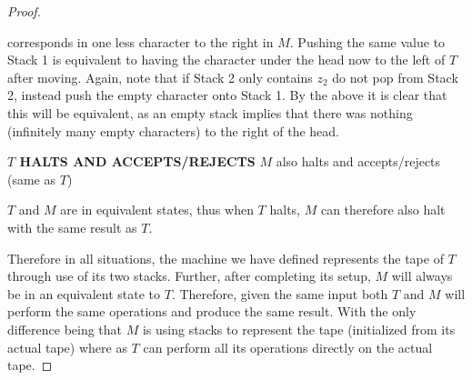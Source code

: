 \documentclass[12pt]{jhwhw}
\begin{document}
\begin{proof}
\begin{addmargin}{1em}
			corresponds in one less character to the right in $M$. Pushing the same value to Stack 1
			is equivalent to having the character under the head now to the left of $T$ after moving.
			Again, note that if Stack 2 only contains $z_2$ do not pop from Stack 2, instead push the 
			empty character onto Stack 1. By the above it is clear that this will be equivalent, as an
			empty stack implies that there was nothing (infinitely many empty characters) to the right
			of the head.
		\end{addmargin}
		\textbf{$T$ HALTS AND ACCEPTS/REJECTS} $M$ also halts and accepts/rejects (same as $T$)
		\begin{addmargin}{1em}
			$T$ and $M$ are in equivalent states, thus when $T$ halts, $M$ can therefore also
			halt with the same result as $T$.
		\end{addmargin}

		Therefore in all situations, the machine we have defined represents the tape of $T$ through 
		use of its two stacks. Further, after completing its setup, $M$ will always be 
		in an equivalent state to $T$. Therefore, given the same input both $T$ and $M$ will perform
		the same operations and produce the same result. With the only difference being
		that $M$ is using stacks to represent the tape (initialized from its actual tape) where as
		$T$ can perform all its operations directly on the actual tape.

	\end{proof}
\end{document}
